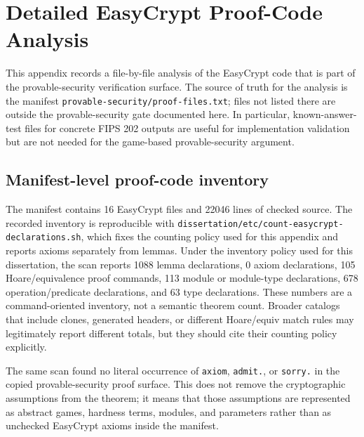 \chapter{Detailed EasyCrypt Proof-Code Analysis}
\label{app:easycrypt-code-analysis}

\providecommand{\ecfile}[1]{\nolinkurl{#1}}
\providecommand{\ecsym}[1]{\nolinkurl{#1}}

This appendix records a file-by-file analysis of the EasyCrypt code that is part
of the provable-security verification surface.  The source of truth for the
analysis is the manifest \ecfile{provable-security/proof-files.txt}; files not
listed there are outside the provable-security gate documented here.  In
particular, known-answer-test files for concrete FIPS 202 outputs are useful for
implementation validation but are not needed for the game-based provable-security
argument.

\section{Manifest-level proof-code inventory}
\label{app:ec-inventory}

The manifest contains 16 EasyCrypt files and 22046 lines of checked source.  The
recorded inventory is reproducible with
\ecfile{dissertation/etc/count-easycrypt-declarations.sh}, which fixes the
counting policy used for this appendix and reports axioms separately from
lemmas.  Under the inventory policy used for this dissertation, the scan reports
1088 lemma declarations, 0 axiom declarations, 105 Hoare/equivalence proof
commands, 113 module or module-type declarations, 678 operation/predicate
declarations, and 63 type declarations.  These
numbers are a command-oriented inventory, not a semantic theorem count.  Broader
catalogs that include clones, generated headers, or different Hoare/equiv match
rules may legitimately report different totals, but they should cite their
counting policy explicitly.

The same scan found no literal occurrence of \ecsym{axiom}, \ecsym{admit.}, or
\ecsym{sorry.} in the copied provable-security proof surface.  This does not
remove the cryptographic assumptions from the theorem; it means that those
assumptions are represented as abstract games, hardness terms, modules, and
parameters rather than as unchecked EasyCrypt axioms inside the manifest.

